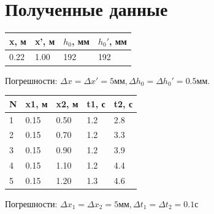 \documentclass[a4paper]{article}
\begin{document}
\section{Полученные данные}
\begin{center}
\begin{table}[H]
\begin{tabular}{|l|l|l|l|}
\hline

x, м & x', м & $h_0$, мм & $h_0'$, мм \\
\hline
0.22 & 1.00 & 192 & 192 \\
\hline
\end{tabular}
\end{table}
Погрешности: $\Delta x=\Delta x'=5\text{мм}, \Delta h_0=\Delta h_0'=0.5\text{мм}$.
\begin{table}[H]
\begin{tabular}{|l|l|l|l|l|}
\hline
N & x1, м & x2, м & t1, с & t2, с \\
\hline
1 & 0.15 & 0.50 & 1.2 & 2.8 \\
\hline
2 & 0.15 & 0.70 & 1.2 & 3.3 \\
\hline
3 & 0.15 & 0.90 & 1.2 & 3.9 \\
\hline
4 & 0.15 & 1.10 & 1.2 & 4.4 \\
\hline
5 & 0.15 & 1.20 & 1.3 & 4.6 \\
\hline
\end{tabular}
\end{table}
\end{center}
\begin{center}
Погрешности: $\Delta x_1=\Delta x_2=5\text{мм}, \Delta t_1=\Delta t_2=0.1\text{с}$
\end{center}
\end{document}
